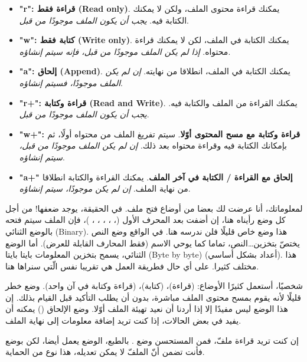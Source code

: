 \begin{itemize}
  \item \textbf{"\textenglish{r}":
قراءة فقط
(\textenglish{Read only})}.
يمكنك قراءة محتوى الملف، ولكن لا يمكنك الكتابة فيه.
\textit{يجب أن يكون الملف موجودًا من قبل}.
  \item \textbf{"\textenglish{w}":
كتابة فقط
(\textenglish{Write only})}.
يمكنك الكتابة في الملف، لكن لا يمكنك قراءة محتواه.
\textit{إذا لم يكن الملف موجودًا من قبل، فإنه سيتم إنشاؤه}.
  \item \textbf{"\textenglish{a}":
إلحاق
(\textenglish{Append})}.
يمكنك الكتابة في الملف، انطلاقا من نهايته.
\textit{إن لم يكن الملف موجودًا، فسيتم إنشاؤه}.
  \item \textbf{"\textenglish{r+}":
قراءة وكتابة
(\textenglish{Read and Write})}.
يمكنك القراءة من الملف والكتابة فيه.
\textit{يجب أن يكون الملف موجودًا من قبل}.
  \item \textbf{"\textenglish{w+}":
قراءة وكتابة مع مسح المحتوى أوّلا}.
سيتم تفريغ الملف من محتواه أولًا، ثم بإمكانك الكتابة فيه وقراءة محتواه بعد ذلك.
\textit{إن لم يكن الملف موجودًا من قبل، سيتم إنشاؤه}.
  \item \textbf{"\textenglish{a+}"
إلحاق مع القراءة / الكتابة في آخر الملف}.
يمكنك القراءة والكتابة انطلاقا من نهاية الملف.
\textit{إن لم يكن موجودًا، سيتم إنشاؤه}.
\end{itemize}

لمعلوماتك، أنا عرضت لك بعضا من أوضاع فتح ملف. في الحقيقة، يوجد ضعفها!
من أجل كل وضع رأيناه هنا، إن أضفت
بعد المحرف الأول
(، ، ، ، ، )،
فإن الملف سيتم فتحه بالوضع الثنائي
(\textenglish{Binary}).
هذا وضع خاص قليلًا فلن ندرسه هنا. في الواقع وضع النص يختصّ بتخزين\dots النص، تماما كما يوحي الاسم (فقط المحارف القابلة للعرض). أما الوضع الثنائي، يسمح بتخزين المعلومات
بايتا بايتا
(\textenglish{Byte by byte})
(أعداد بشكل أساسي). هذا مختلف كثيرا. على أي حال فطريقة العمل هي تقريبا نفس الّتي سنراها هنا.

شخصيًا، أستعمل كثيرًا الأوضاع:
(قراءة)،
(كتابة)،
(قراءة وكتابة في آن واحد). وضع
خطر قليلًا لأنه يقوم بمسح محتوى الملف مباشرة، بدون أن يطلب التأكيد قبل القيام بذلك. إن هذا الوضع ليس مفيدًا إلا إذا أردنا أن نعيد تهيئة الملف أوّلا.
وضع الإلحاق
()
يمكنه أن يفيد في بعض الحالات، إذا كنت تريد إضافة معلومات إلى نهاية الملف.

\begin{information}
  إن كنت تريد قراءة ملفّ، فمن المستحسن وضع
.
بالطبع، الوضع
يعمل أيضا، لكن بوضع
فأنت تضمن أنّ الملفّ لا يمكن تعديله، هذا نوع من الحماية.
\end{information}

